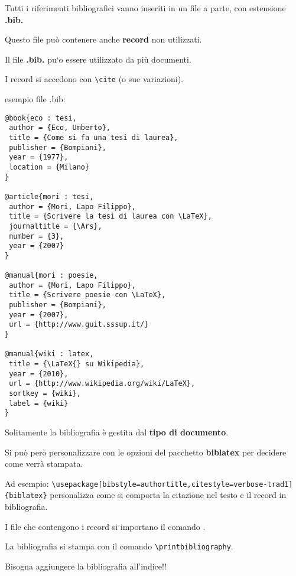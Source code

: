 \documentclass{article}
\begin{document}
            Tutti i riferimenti bibliografici vanno inseriti in un file a parte,
            con estensione \textbf{.bib.}

            Questo file può contenere anche \textbf{record} non utilizzati.

            Il file \textbf{.bib.} pu`o essere utilizzato da più documenti.

            I record si accedono con \verb!\cite! (o sue variazioni).

            esempio file .bib:

\begin{minipage}{\linewidth}
\begin{lstlisting}[frame=single]
@book{eco : tesi,
 author = {Eco, Umberto},
 title = {Come si fa una tesi di laurea},
 publisher = {Bompiani},
 year = {1977},
 location = {Milano}
}

@article{mori : tesi,
 author = {Mori, Lapo Filippo},
 title = {Scrivere la tesi di laurea con \LaTeX},
 journaltitle = {\Ars},
 number = {3},
 year = {2007}
}

@manual{mori : poesie,
 author = {Mori, Lapo Filippo},
 title = {Scrivere poesie con \LaTeX},
 publisher = {Bompiani},
 year = {2007},
 url = {http://www.guit.sssup.it/}
}

@manual{wiki : latex,
 title = {\LaTeX{} su Wikipedia},
 year = {2010},
 url = {http://www.wikipedia.org/wiki/LaTeX},
 sortkey = {wiki},
 label = {wiki}
}       
\end{lstlisting}           
\end{minipage}
            
Solitamente la bibliografia è gestita dal \textbf{tipo di documento}.

Si può però personalizzare con le opzioni del pacchetto \textbf{biblatex}
per decidere come verrà stampata.

Ad esempio: 
\verb!\usepackage[bibstyle=authortitle,citestyle=verbose-trad1]{biblatex}!
personalizza come si comporta la citazione nel testo e il record in
bibliografia.

I file che contengono i record si importano il comando
\verb!!.

La bibliografia si stampa con il comando \verb!\printbibliography!.

Bisogna aggiungere la bibliografia all'indice!!
\end{document}
